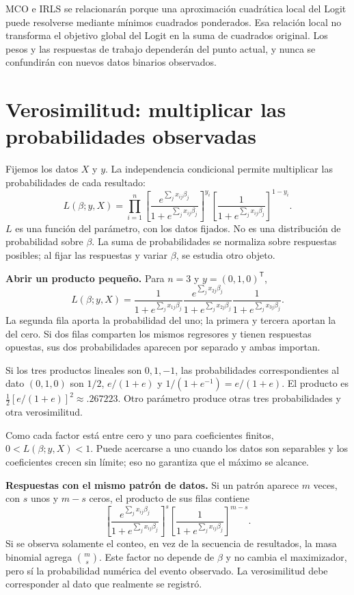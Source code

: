 \documentclass[11pt,a4paper]{article}
\newcommand{\T}{^{\mathsf T}}
\begin{document}
MCO e IRLS se relacionarán porque una aproximación cuadrática local
del Logit puede resolverse mediante mínimos cuadrados ponderados.
Esa relación local no transforma el objetivo global del Logit en
la suma de cuadrados original.
Los pesos y las respuestas de trabajo dependerán del punto actual,
y nunca se confundirán con nuevos datos binarios observados.

\clearpage
\section{Verosimilitud: multiplicar las probabilidades observadas}\label{logit13}
Fijemos los datos $X$ y $y$. La independencia condicional permite
multiplicar las probabilidades de cada resultado:
\[
L(\beta;y,X)=\prod_{i=1}^n
\left[\frac{e^{\sum_jx_{ij}\beta_j}}
{1+e^{\sum_jx_{ij}\beta_j}}\right]^{y_i}
\left[\frac1{1+e^{\sum_jx_{ij}\beta_j}}\right]^{1-y_i}.
\]
$L$ es una función del parámetro, con los datos fijados.
No es una distribución de probabilidad sobre $\beta$.
La suma de probabilidades se normaliza sobre respuestas posibles;
al fijar las respuestas y variar $\beta$, se estudia otro objeto.

\textbf{Abrir un producto pequeño.}
Para $n=3$ y $y=(0,1,0)\T$,
\[
L(\beta;y,X)=
\frac1{1+e^{\sum_jx_{1j}\beta_j}}
\frac{e^{\sum_jx_{2j}\beta_j}}{1+e^{\sum_jx_{2j}\beta_j}}
\frac1{1+e^{\sum_jx_{3j}\beta_j}}.
\]
La segunda fila aporta la probabilidad del uno;
la primera y tercera aportan la del cero.
Si dos filas comparten los mismos regresores y tienen respuestas opuestas,
sus dos probabilidades aparecen por separado y ambas importan.

\begin{ejemplo}
Si los tres productos lineales son $0,1,-1$, las probabilidades
correspondientes al dato $(0,1,0)$ son
$1/2$, $e/(1+e)$ y $1/(1+e^{-1})=e/(1+e)$.
El producto es $\tfrac12[e/(1+e)]^2\approx.267223$.
Otro parámetro produce otras tres probabilidades y otra verosimilitud.
\end{ejemplo}
Como cada factor está entre cero y uno para coeficientes finitos,
$0<L(\beta;y,X)<1$.
Puede acercarse a uno cuando los datos son separables y los
coeficientes crecen sin límite; eso no garantiza que el máximo se alcance.

\textbf{Respuestas con el mismo patrón de datos.}
Si un patrón aparece $m$ veces, con $s$ unos y $m-s$ ceros,
el producto de sus filas contiene
\[
\left[\frac{e^{\sum_jx_{ij}\beta_j}}
{1+e^{\sum_jx_{ij}\beta_j}}\right]^s
\left[\frac1{1+e^{\sum_jx_{ij}\beta_j}}\right]^{m-s}.
\]
Si se observa solamente el conteo, en vez de la secuencia de resultados,
la masa binomial agrega $\binom ms$. Este factor no depende de
$\beta$ y no cambia el maximizador, pero sí la probabilidad numérica
del evento observado. La verosimilitud debe corresponder al dato que
realmente se registró.
\end{document}
